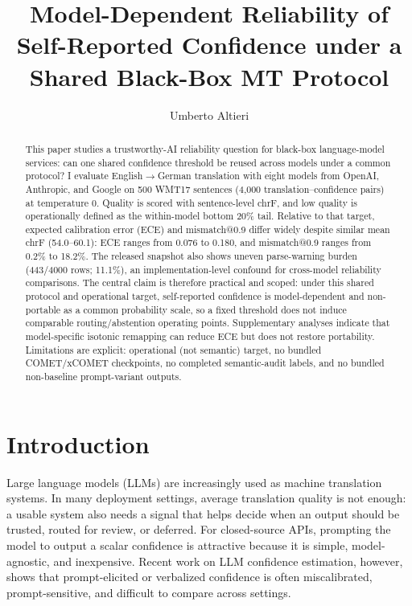 \documentclass[10pt,conference]{IEEEtran}
\title{Model-Dependent Reliability of Self-Reported Confidence under a Shared Black-Box MT Protocol}
\author{Umberto Altieri}
\date{}
\begin{document}
\maketitle

\begin{abstract}
This paper studies a trustworthy-AI reliability question for black-box language-model services: can one shared confidence threshold be reused across models under a common protocol? I evaluate English$\rightarrow$German translation with eight models from OpenAI, Anthropic, and Google on 500 WMT17 sentences (4,000 translation--confidence pairs) at temperature 0. Quality is scored with sentence-level chrF, and low quality is operationally defined as the within-model bottom 20\% tail. Relative to that target, expected calibration error (ECE) and mismatch@0.9 differ widely despite similar mean chrF (54.0--60.1): ECE ranges from 0.076 to 0.180, and mismatch@0.9 ranges from 0.2\% to 18.2\%. The released snapshot also shows uneven parse-warning burden (443/4000 rows; 11.1\%), an implementation-level confound for cross-model reliability comparisons. The central claim is therefore practical and scoped: under this shared protocol and operational target, self-reported confidence is model-dependent and non-portable as a common probability scale, so a fixed threshold does not induce comparable routing/abstention operating points. Supplementary analyses indicate that model-specific isotonic remapping can reduce ECE but does not restore portability. Limitations are explicit: operational (not semantic) target, no bundled COMET/xCOMET checkpoints, no completed semantic-audit labels, and no bundled non-baseline prompt-variant outputs.
\end{abstract}

\section{Introduction}

Large language models (LLMs) are increasingly used as machine translation systems. In many deployment settings, average translation quality is not enough: a usable system also needs a signal that helps decide when an output should be trusted, routed for review, or deferred. For closed-source APIs, prompting the model to output a scalar confidence is attractive because it is simple, model-agnostic, and inexpensive. Recent work on LLM confidence estimation, however, shows that prompt-elicited or verbalized confidence is often miscalibrated, prompt-sensitive, and difficult to compare across settings.
\end{document}
